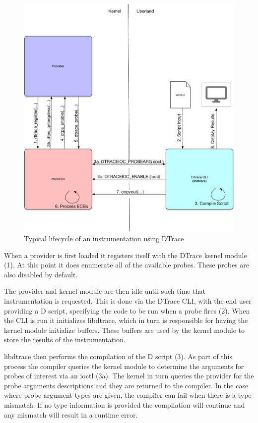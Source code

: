 \begin{figure}[htpb]
	\centering
	\includegraphics[width=0.8\linewidth]{dtrace-lifecycle.pdf}
	\caption{Typical lifecycle of an instrumentation using DTrace}
	\label{fig:lifecycle}
\end{figure}

When a provider is first loaded it registers itself with the DTrace
kernel module (1). At this point it does enumerate all of the
available probes. These probes are also disabled by default.

The provider and kernel module are then idle until such time that
instrumentation is requested. This is done via the DTrace CLI, with
the end user providing a D script, specifying the code to be run when
a probe fires (2). When the CLI is run it initializes libdtrace, which
in turn is responsible for having the kernel module initialize
buffers. These buffers are used by the kernel module to store the
results of the instrumentation.

libdtrace then performs the compilation of the D script (3). As part
of this process the compiler queries the kernel module to determine
the arguments for probes of interest via an ioctl (3a). The kernel in
turn queries the provider for the probe arguments descriptions and
they are returned to the compiler. In the case where probe argument
types are given, the compiler can fail when there is a type
mismatch. If no type information is provided the compilation will
continue and any mismatch will result in a runtime error.

